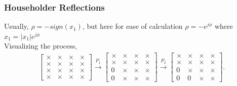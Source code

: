 \documentclass{beamer}
\theoremstyle{remark}
\numberwithin{equation}{section}
\begin{document}
    \begin{frame}
      \frametitle{Householder Reflections}

      Usually, $\rho=-sign(x_1)$, but here for ease of calculation $\rho= -e^{j\phi}$ where $x_1=|x_1| e^{j\phi}$\\
      Visualizing the process,
      \begin{align}
        \begin{bmatrix}
          \times & \times & \times & \times \\
          \times & \times & \times & \times \\
          \times & \times & \times & \times \\
          \times & \times & \times & \times
        \end{bmatrix}
        \xrightarrow{P_1}
        \begin{bmatrix}
          \times & \times & \times & \times \\
          \times & \times & \times & \times \\
          0 & \times & \times & \times \\
          0 & \times & \times & \times
        \end{bmatrix}
        \xrightarrow{P_2}
        \begin{bmatrix}
          \times & \times & \times & \times \\
          \times & \times & \times & \times \\
          0 & \times & \times & \times \\
          0 & 0 & \times & \times
        \end{bmatrix}.
      \end{align}      \end{frame}
\end{document}
